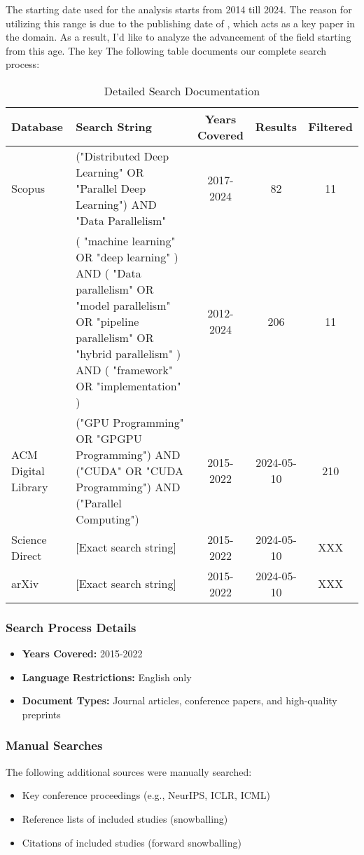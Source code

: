 The starting date used for the analysis starts from 2014 till 2024. The reason for utilizing this range
is due to the publishing date of \cite{SierraCanto2010ParallelTO}, which acts as a key paper in the domain. As a result,
I'd like to analyze the advancement of the field starting from this age. The key The following table 
documents our complete search process:

\begin{table*}[htbp!]
    \centering
    \caption{Detailed Search Documentation}
    \label{tab:search_documentation}
    \begin{tabularx}{\textwidth}{|l|X|c|c|c|}
        \hline
        \textbf{Database} & \textbf{Search String} & \textbf{Years Covered} & \textbf{Results} & \textbf{Filtered} \\
        \hline
        Scopus & ("Distributed Deep Learning" OR "Parallel Deep Learning") AND "Data Parallelism" & 2017-2024 & 82 & 11 \\
               & ( "machine learning" OR "deep learning" ) AND ( "Data parallelism" OR "model parallelism" OR "pipeline parallelism" OR "hybrid parallelism" ) AND ( "framework" OR "implementation" ) & 2012-2024 & 206 & 11 \\
        \hline
        ACM Digital Library & ("GPU Programming" OR "GPGPU Programming") AND ("CUDA" OR "CUDA Programming") AND ("Parallel Computing") & 2015-2022 & 2024-05-10 & 210 \\
        \hline
        Science Direct & [Exact search string] & 2015-2022 & 2024-05-10 & XXX \\
        \hline
        arXiv & [Exact search string] & 2015-2022 & 2024-05-10 & XXX \\
        \hline
    \end{tabularx}
\end{table*}


\subsubsection{Search Process Details}
\begin{itemize}
    \item \textbf{Years Covered:} 2015-2022
    \item \textbf{Language Restrictions:} English only
    \item \textbf{Document Types:} Journal articles, conference papers, and high-quality preprints
\end{itemize}

\subsubsection{Manual Searches}
The following additional sources were manually searched:
\begin{itemize}
    \item Key conference proceedings (e.g., NeurIPS, ICLR, ICML)
    \item Reference lists of included studies (snowballing)
    \item Citations of included studies (forward snowballing)
\end{itemize}

